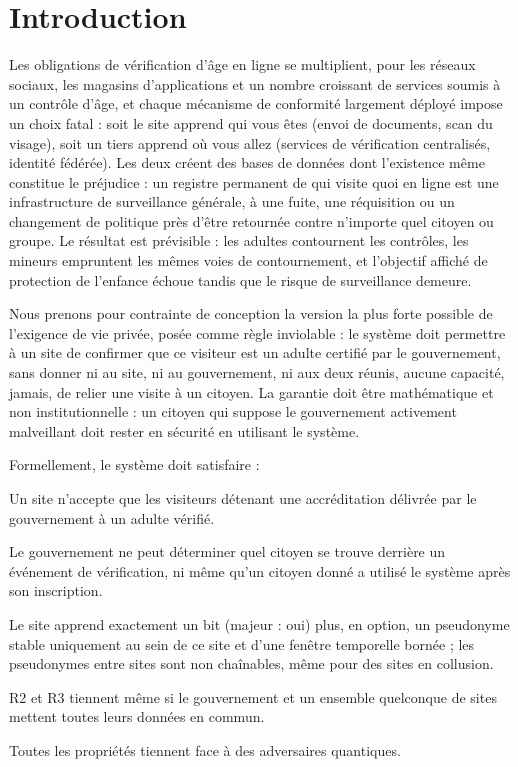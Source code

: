 \documentclass[11pt]{article}
\theoremstyle{definition}
\begin{document}
\section{Introduction}

Les obligations de vérification d'âge en ligne se multiplient, pour les réseaux sociaux,
les magasins d'applications et un nombre croissant de services soumis à un contrôle d'âge,
et chaque mécanisme de conformité largement déployé impose un choix fatal : soit le site
apprend qui vous êtes (envoi de documents, scan du visage), soit un tiers apprend où vous
allez (services de vérification centralisés, identité fédérée). Les deux créent des bases
de données dont l'existence même constitue le préjudice : un registre permanent de qui
visite quoi en ligne est une infrastructure de surveillance générale, à une fuite, une
réquisition ou un changement de politique près d'être retournée contre n'importe quel
citoyen ou groupe. Le résultat est prévisible : les adultes contournent les contrôles, les
mineurs empruntent les mêmes voies de contournement, et l'objectif affiché de protection
de l'enfance échoue tandis que le risque de surveillance demeure.

Nous prenons pour contrainte de conception la version la plus forte possible de l'exigence
de vie privée, posée comme règle inviolable : le système doit permettre à un site de
confirmer que ce visiteur est un adulte certifié par le gouvernement, sans donner ni au
site, ni au gouvernement, ni aux deux réunis, aucune capacité, jamais, de relier une
visite à un citoyen. La garantie doit être mathématique et non institutionnelle : un
citoyen qui suppose le gouvernement activement malveillant doit rester en sécurité en
utilisant le système.

Formellement, le système doit satisfaire :
\begin{description}[leftmargin=2.6em,style=nextline]
\item[R1 (Solidité).] Un site n'accepte que les visiteurs détenant une accréditation
délivrée par le gouvernement à un adulte vérifié.
\item[R2 (Aveuglement de l'émetteur).] Le gouvernement ne peut déterminer quel citoyen se
trouve derrière un événement de vérification, ni même qu'un citoyen donné a utilisé le
système après son inscription.
\item[R3 (Aveuglement du vérifieur).] Le site apprend exactement un bit (majeur : oui)
plus, en option, un pseudonyme stable uniquement au sein de ce site et d'une fenêtre
temporelle bornée ; les pseudonymes entre sites sont non chaînables, même pour des sites
en collusion.
\item[R4 (Résistance à la collusion).] R2 et R3 tiennent même si le gouvernement et un
ensemble quelconque de sites mettent toutes leurs données en commun.
\item[R5 (Sécurité post-quantique).] Toutes les propriétés tiennent face à des adversaires
quantiques.
\end{description}
\end{document}
